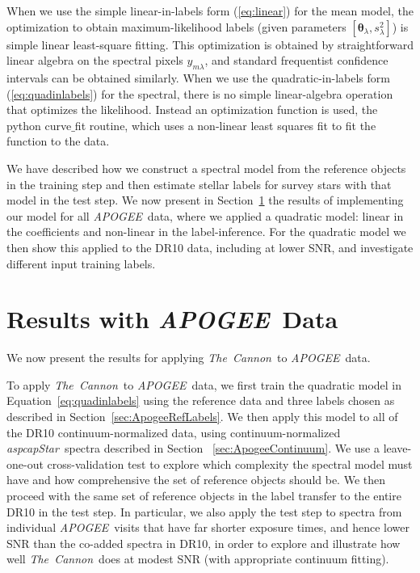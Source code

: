 \documentclass[12pt, preprint]{aastex}
\newcommand{\sectionname}{Section}
\newcommand{\tc}{\textsl{The~Cannon}}
\newcommand{\apogee}{\textsl{APOGEE}}
\newcommand{\aspcapstar}{\textsl{aspcapStar}}
\newcommand{\set}[1]{\bm{#1}}
\begin{document}
When we use the simple linear-in-labels form (\ref{eq:linear}) for the
mean model, the optimization to obtain maximum-likelihood labels
(given parameters $[\set{\theta}_\lambda, s_\lambda^2]$) is simple linear
least-square fitting.
This optimization is obtained by straightforward linear algebra on the
spectral pixels $y_{m\lambda}$, and standard frequentist confidence
intervals can be obtained similarly.
When we use the quadratic-in-labels form (\ref{eq:quadinlabels}) for the
spectral, there is no simple linear-algebra operation that
optimizes the likelihood. 
Instead an optimization function is used, the python curve$\_$fit routine, which uses a non-linear least squares fit to fit the function to the data. 

We have described how we construct a spectral model from the reference objects in the training step and then 
estimate stellar labels for survey stars with that model in the test step. 
We now present in \sectionname~\ref{sec:results} the results of implementing our model for all \apogee\ data, where we applied a quadratic model: linear in the coefficients and non-linear in the label-inference.  
For the quadratic model we then show this applied to the DR10 data, including at lower SNR, and investigate different input training labels. 

\section{Results with \apogee\ Data}
\label{sec:results}


We now present the results for applying \tc\ to \apogee\ data. 

To apply \tc\ to \apogee\ data, we first train the quadratic model in Equation~\ref{eq:quadinlabels} using the reference data and three labels chosen as described in Section~\ref{sec:ApogeeRefLabels}. We then apply this model to all of the DR10 continuum-normalized data, using continuum-normalized \aspcapstar\ spectra described in Section~ \ref{sec:ApogeeContinuum}. We use a leave-one-out cross-validation test to explore which complexity the spectral model must have and how comprehensive the set of reference objects should be. We then proceed with the same set of reference objects in the label transfer to the entire DR10 in the test step. In particular, we also apply the test step to spectra from individual \apogee\ visits that have far shorter exposure times, and hence lower SNR than the co-added spectra in DR10, in order to explore and illustrate how well \tc\ does at modest SNR (with appropriate continuum fitting).
\end{document}
